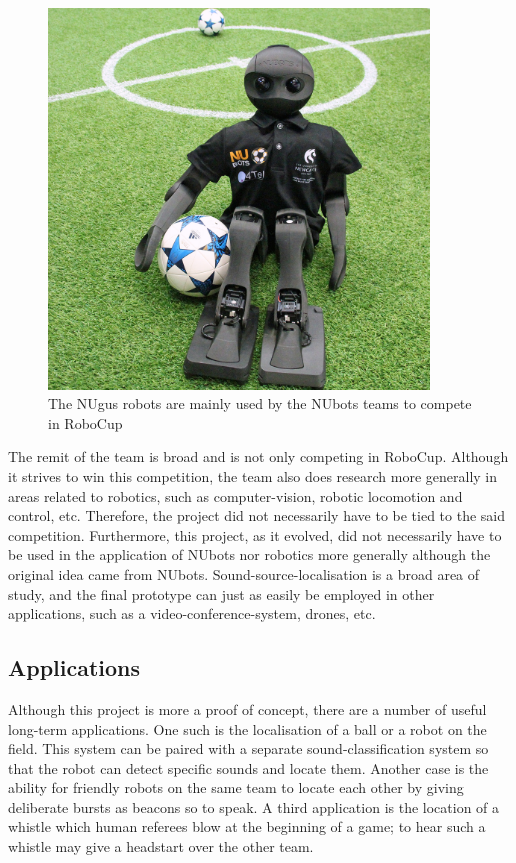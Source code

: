 \documentclass[notitlepage]{report}
\begin{document}
\begin{figure}[H]
\includegraphics[width=0.9\textwidth]{./NUbot-sitting-down.jpg}
\centering
\caption{The NUgus robots are mainly used by the NUbots teams to compete in RoboCup}
\label{fig:nuguses}
\centering
\end{figure}

The remit of the team is broad and is not only competing in RoboCup. Although it strives to win this competition, the team also does research more generally in areas related to robotics, such as computer-vision, robotic locomotion and control, etc. Therefore, the project did not necessarily have to be tied to the said competition. Furthermore, this project, as it evolved, did not necessarily have to be used in the application of NUbots nor robotics more generally although the original idea came from NUbots. Sound-source-localisation is a broad area of study, and the final prototype can just as easily be employed in other applications, such as a video-conference-system, drones, etc.

\subsection{Applications}

Although this project is more a proof of concept, there are a number of useful long-term applications. One such is the localisation of a ball or a robot on the field. This system can be paired with a separate sound-classification system so that the robot can detect specific sounds and locate them. Another case is the ability for friendly robots on the same team to locate each other by giving deliberate bursts as beacons so to speak. A third application is the location of a whistle which human referees blow at the beginning of a game; to hear such a whistle may give a headstart over the other team.
\end{document}
